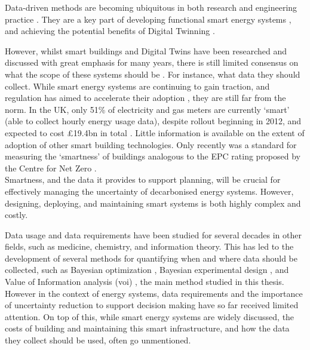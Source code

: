 Data-driven methods are becoming ubiquitous in both research  and engineering practice . They are a key part of developing functional smart energy systems , and achieving the potential benefits of Digital Twinning .

However, whilst smart buildings and Digital Twins have been researched and discussed with great emphasis for many years, there is still limited consensus on what the scope of these systems should be . For instance, what data they should collect. While smart energy systems are continuing to gain traction, and regulation has aimed to accelerate their adoption , they are still far from the norm. In the UK, only 51\% of electricity and gas meters are currently `smart' (able to collect hourly energy usage data), despite rollout beginning in 2012, and expected to cost £19.4bn in total . Little information is available on the extent of adoption of other smart building technologies. Only recently was a standard for measuring the `smartness' of buildings analogous to the EPC rating proposed by the Centre for Net Zero .\\

Smartness, and the data it provides to support planning, will be crucial for effectively managing the uncertainty of decarbonised energy systems. %
However, designing, deploying, and maintaining smart systems is both highly complex and costly. %

Data usage and data requirements have been studied for several decades in other fields, such as medicine, chemistry, and information theory. %
This has led to the development of several methods for quantifying when and where data should be collected, such as Bayesian optimization , Bayesian experimental design , and Value of Information analysis (\gls{voi}) , the main method studied in this thesis.
However in the context of energy systems, data requirements and the importance of uncertainty reduction to support decision making have so far received limited attention. On top of this, while smart energy systems are widely discussed, the costs of building and maintaining this smart infrastructure, and how the data they collect should be used, often go unmentioned.

